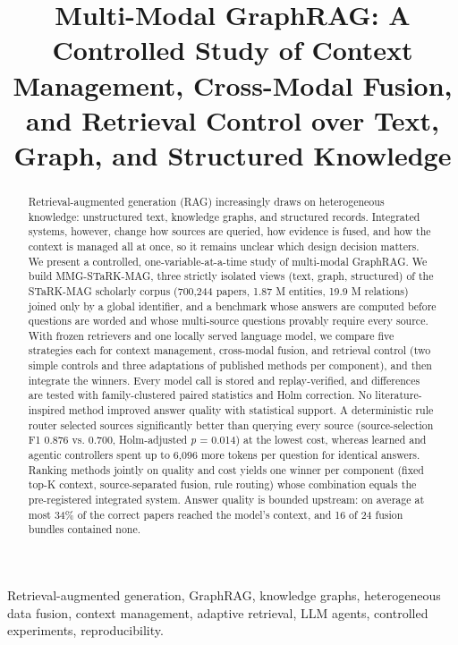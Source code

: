 \documentclass[conference]{IEEEtran}
\begin{document}
\title{Multi-Modal GraphRAG: A Controlled Study of Context Management, Cross-Modal Fusion, and Retrieval Control over Text, Graph, and Structured Knowledge}
\author{
}
\maketitle

\begin{abstract}
Retrieval-augmented generation (RAG) increasingly draws on heterogeneous knowledge: unstructured text, knowledge graphs, and structured records. Integrated systems, however, change how sources are queried, how evidence is fused, and how the context is managed all at once, so it remains unclear which design decision matters. We present a controlled, one-variable-at-a-time study of multi-modal GraphRAG. We build MMG-STaRK-MAG, three strictly isolated views (text, graph, structured) of the STaRK-MAG scholarly corpus (700,244 papers, 1.87 M entities, 19.9 M relations) joined only by a global identifier, and a benchmark whose answers are computed before questions are worded and whose multi-source questions provably require every source. With frozen retrievers and one locally served language model, we compare five strategies each for context management, cross-modal fusion, and retrieval control (two simple controls and three adaptations of published methods per component), and then integrate the winners. Every model call is stored and replay-verified, and differences are tested with family-clustered paired statistics and Holm correction. No literature-inspired method improved answer quality with statistical support. A deterministic rule router selected sources significantly better than querying every source (source-selection F1 0.876 vs. 0.700, Holm-adjusted \emph{p} = 0.014) at the lowest cost, whereas learned and agentic controllers spent up to 6,096 more tokens per question for identical answers. Ranking methods jointly on quality and cost yields one winner per component (fixed top-K context, source-separated fusion, rule routing) whose combination equals the pre-registered integrated system. Answer quality is bounded upstream: on average at most 34\% of the correct papers reached the model's context, and 16 of 24 fusion bundles contained none.
\end{abstract}

\begin{IEEEkeywords}
Retrieval-augmented generation, GraphRAG, knowledge graphs, heterogeneous data fusion, context management, adaptive retrieval, LLM agents, controlled experiments, reproducibility.
\end{IEEEkeywords}
\end{document}

